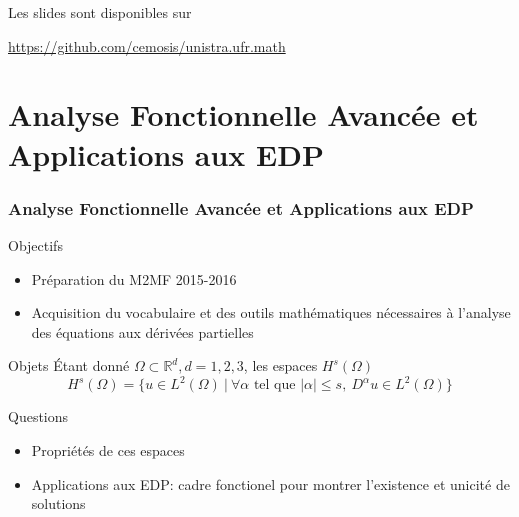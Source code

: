 \documentclass{beamer}
\begin{document}
\begin{frame}
  Les slides sont disponibles sur
  \begin{center}
    \centerline{\url{https://github.com/cemosis/unistra.ufr.math}}
  \end{center}
\end{frame}

\section{Analyse Fonctionnelle Avancée et Applications aux EDP}

\begin{frame}\frametitle{Analyse Fonctionnelle Avancée et Applications
    aux EDP}
  \begin{block}{Objectifs}
    \begin{itemize}
    \item Préparation du M2MF 2015-2016
    \item Acquisition du vocabulaire et des outils mathématiques nécessaires à
      l'analyse des équations aux dérivées partielles
    \end{itemize}
  \end{block}
  \begin{block}{Objets}
    Étant donné $\Omega \subset \mathbb{R}^d, d=1,2,3$, les espaces $H^s(\Omega)$
    \begin{equation*}
      H^s(\Omega)=\{ u \in L^2(\Omega)~|~\forall\alpha\text{ tel que }|\alpha|\le s,~D^\alpha u\in L^2(\Omega)\}
    \end{equation*}
  \end{block}
  \begin{block}{Questions}
    \begin{itemize}
    \item Propriétés de ces espaces
    \item Applications aux EDP: cadre fonctionel pour montrer
      l'existence et unicité de solutions
    \end{itemize}
  \end{block}
\end{frame}
\end{document}
